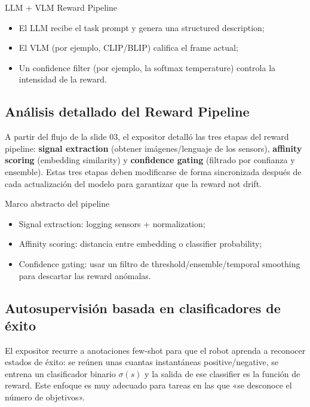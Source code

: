 \documentclass[a4paper]{article}
\begin{document}
\begin{knowledgebox}{LLM + VLM Reward Pipeline}
\begin{itemize}
\item El LLM recibe el task prompt y genera una structured description;\\
\item El VLM (por ejemplo, CLIP/BLIP) califica el frame actual;\\
\item Un confidence filter (por ejemplo, la softmax temperature) controla la intensidad de la reward.
\end{itemize}
\end{knowledgebox}

\subsection{Análisis detallado del Reward Pipeline}
A partir del flujo de la slide 03, el expositor detalló las tres etapas del reward pipeline: \textbf{signal extraction} (obtener imágenes/lenguaje de los sensors), \textbf{affinity scoring} (embedding similarity) y \textbf{confidence gating} (filtrado por confianza y ensemble). Estas tres etapas deben modificarse de forma sincronizada después de cada actualización del modelo para garantizar que la reward not drift.

\begin{importantbox}{Marco abstracto del pipeline}
\begin{itemize}
\item Signal extraction: logging sensors + normalization;\\
\item Affinity scoring: distancia entre embedding o classifier probability;\\
\item Confidence gating: usar un filtro de threshold/ensemble/temporal smoothing para descartar las reward anómalas.
\end{itemize}
\end{importantbox}

\subsection{Autosupervisión basada en clasificadores de éxito}
El expositor recurre a anotaciones few-shot para que el robot aprenda a reconocer estados de éxito: se reúnen unas cuantas instantáneas positive/negative, se entrena un clasificador binario $\sigma(s)$ y la salida de ese classifier es la función de reward. Este enfoque es muy adecuado para tareas en las que «se desconoce el número de objetivos».
\end{document}
